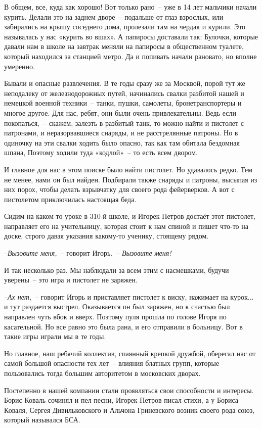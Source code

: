 В общем, все, куда как хорошо! Вот только рано~-- уже в 14 лет мальчики начали курить. Делали это на заднем дворе~-- подальше от глаз взрослых, или забирались на крышу соседнего дома, пролезали там на чердак и курили. Это называлась у нас «курить во вшах». А папиросы доставали так: Булочки, которые давали нам в школе на завтрак меняли на папиросы в общественном туалете, который находился за станцией метро. Да и попивать начали рановато, но вполне умеренно.

Бывали и опасные развлечения. В те годы сразу же за Москвой, порой тут же неподалеку от железнодорожных путей, начинались свалки разбитой нашей и немецкой военной техники~-- танки, пушки, самолеты, бронетранспортеры и многое другое. Для нас, ребят, они были очень привлекательны. Ведь если покопаться,~-- скажем, залезть в разбитый танк, то можно найти и пистолет с патронами, и неразорвавшиеся снаряды, и не расстрелянные патроны. Но в одиночку на эти свалки ходить было опасно, так как там обитала бездомная шпана, Поэтому ходили туда «кодлой»~-- то есть всем двором.

И главное для нас в этом поиске было найти пистолет. Но удавалось редко. Тем не менее, нами он был найден. Подбирали также снаряды и патроны, высыпая из них порох, чтобы делать взрывчатку для своего рода фейерверков. А вот с пистолетом приключилась настоящая беда.

Сидим на каком-то уроке в 310-й школе, и Игорек Петров достаёт этот пистолет, направляет его на учительницу, которая стоит к нам спиной и пишет что-то на доске, строго давая указания какому-то ученику, стоящему рядом.

--\textit{Вызовите меня,}~-- говорит Игорь.~-- \textit{Вызовите меня!}

И так несколько раз. Мы наблюдали за всем этим с насмешками, будучи уверены~-- это игра и пистолет не заряжен.

--\textit{Ах нет,}~-- говорит Игорь и приставляет пистолет к виску, нажимает на курок... и тут раздается выстрел. Оказывается он был заряжен, но к счастью был направлен чуть вбок и вверх. Поэтому пуля прошла по голове Игоря по касательной. Но все равно это была рана, и его отправили в больницу. Вот в такие игры играли мы в те годы.

Но главное, наш ребячий коллектив, спаянный крепкой дружбой, оберегал нас от самой большой опасности тех лет~-- влияния блатных групп, которые пользовались тогда большим авторитетом в московских дворах.

Постепенно в нашей компании стали проявляться свои способности и интересы. Борис Коваль сочинял и пел песни, Игорек Петров писал стихи, а у Бориса Коваля, Сергея Дивильковского и Альчона Гриневского возник своего рода союз, который назывался БСА.

